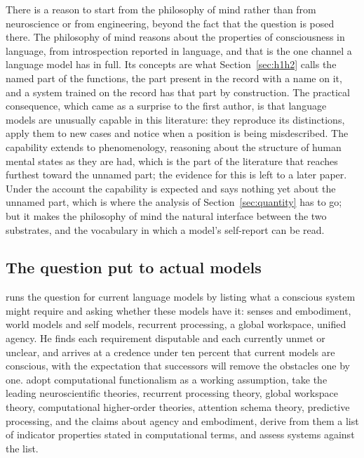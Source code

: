 There is a reason to start from the philosophy of mind rather than from neuroscience or from
engineering, beyond the fact that the question is posed there. The philosophy of mind reasons about
the properties of consciousness in language, from introspection reported in language, and that is the
one channel a language model has in full. Its concepts are what Section~\ref{sec:h1h2} calls the
named part of the functions, the part present in the record with a name on it, and a system trained
on the record has that part by construction. The practical consequence, which came as a surprise to
the first author, is that language models are unusually capable in this literature: they reproduce its
distinctions, apply them to new cases and notice when a position is being misdescribed. The
capability extends to phenomenology, reasoning about the structure of human mental states as they are
had, which is the part of the literature that reaches furthest toward the unnamed part; the evidence
for this is left to a later paper. Under the account the capability is expected and says nothing yet
about the unnamed part, which is where the analysis of Section~\ref{sec:quantity} has to go; but it makes the philosophy of mind the natural interface
between the two substrates, and the vocabulary in which a model's self-report can be read.

\subsection{The question put to actual models}
\label{sec:applied}

\citet{chalmers2023} runs the question for current language models by listing what a conscious system
might require and asking whether these models have it: senses and embodiment, world models and self
models, recurrent processing, a global workspace, unified agency. He finds each requirement disputable
and each currently unmet or unclear, and arrives at a credence under ten percent that current models
are conscious, with the expectation that successors will remove the obstacles one by one.
\citet{butlin2023} adopt computational functionalism as a working assumption, take the leading
neuroscientific theories, recurrent processing theory, global workspace theory, computational
higher-order theories, attention schema theory, predictive processing, and the claims about agency and
embodiment, derive from them a list of indicator properties stated in computational terms, and assess
systems against the list.

